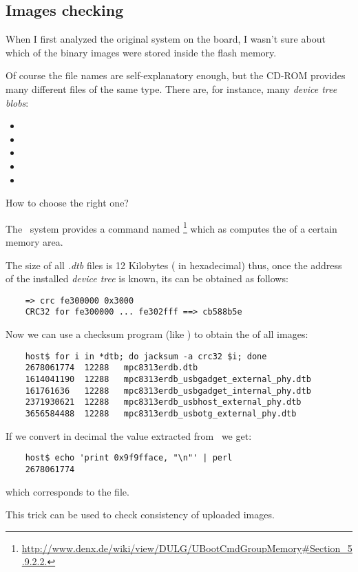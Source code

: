 \subsection{ Images checking }

    When I first analyzed the original system on the board, I
    wasn't sure about which of the binary images were stored
    inside the flash memory.

    Of course the file names are self-explanatory enough, but the
    CD-ROM provides many different files of the same type. There
    are, for instance, many \emph{device tree blobs}:
    \begin{itemize}
        \item {}
        \item {}
        \item {}
        \item {}
        \item {}
    \end{itemize}
    How to choose the right one?

    The \uBoot\ system provides a command named
    \footnote{
        \url{http://www.denx.de/wiki/view/DULG/UBootCmdGroupMemory\#Section\_5.9.2.2.}
    }
    which as computes the  of a certain
    memory area.

    The size of all \emph{.dtb} files is 12 Kilobytes
    ( in hexadecimal) thus, once
    the address of the installed \emph{device tree} is known, its
     can be obtained as follows:
\begin{lstlisting}
    => crc fe300000 0x3000
    CRC32 for fe300000 ... fe302fff ==> cb588b5e
\end{lstlisting}

    Now we can use a checksum program (like ) to
    obtain the  of all images:
\begin{lstlisting}
    host$ for i in *dtb; do jacksum -a crc32 $i; done
    2678061774	12288	mpc8313erdb.dtb
    1614041190	12288	mpc8313erdb_usbgadget_external_phy.dtb
    161761636	12288	mpc8313erdb_usbgadget_internal_phy.dtb
    2371930621	12288	mpc8313erdb_usbhost_external_phy.dtb
    3656584488	12288	mpc8313erdb_usbotg_external_phy.dtb
\end{lstlisting}
    If we convert in decimal the value extracted from \uBoot\ we
    get:
\begin{lstlisting}
    host$ echo 'print 0x9f9fface, "\n"' | perl
    2678061774
\end{lstlisting}
    which corresponds to the  file.

    This trick can be used to check consistency of uploaded
    images.

